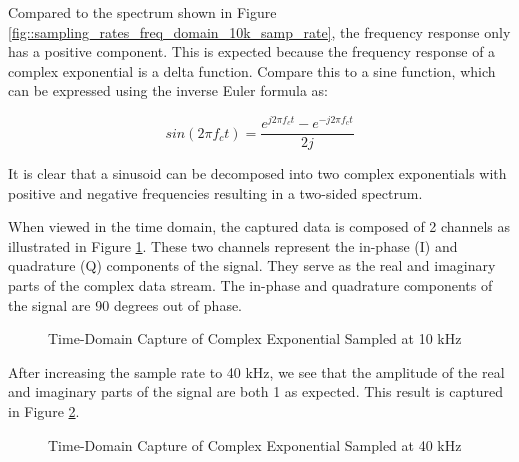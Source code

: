 \documentclass{article}
\begin{document}
Compared to the spectrum shown in Figure \ref{fig::sampling_rates_freq_domain_10k_samp_rate}, the frequency response only has a positive component. This is expected because the frequency response of a complex exponential is a delta function. Compare this to a sine function, which can be expressed using the inverse Euler formula as:

\begin{equation}
	sin(2{\pi}{f_c}t) = \frac{e^{j2{\pi}{f_c}t} - e^{-j2{\pi}{f_c}t}}{2j}
\end{equation}

It is clear that a sinusoid can be decomposed into two complex exponentials with positive and negative frequencies resulting in a two-sided spectrum.

When viewed in the time domain, the captured data is composed of 2 channels as illustrated in Figure \ref{fig::complex_sampling_time_domain_10k_samp_rate}. These two channels represent the in-phase (I) and quadrature (Q) components of the signal. They serve as the real and imaginary parts of the complex data stream. The in-phase and quadrature components of the signal are 90 degrees out of phase.

\begin{figure}[H]
	\centerline{}
	\caption{Time-Domain Capture of Complex Exponential Sampled at 10 kHz}
	\label{fig::complex_sampling_time_domain_10k_samp_rate}
\end{figure}

After increasing the sample rate to 40 kHz, we see that the amplitude of the real and imaginary parts of the signal are both 1 as expected. This result is captured in Figure \ref{fig::complex_sampling_time_domain_40k_samp_rate}.

\begin{figure}[H]
	\centerline{}
	\caption{Time-Domain Capture of Complex Exponential Sampled at 40 kHz}
	\label{fig::complex_sampling_time_domain_40k_samp_rate}
\end{figure}
\end{document}
